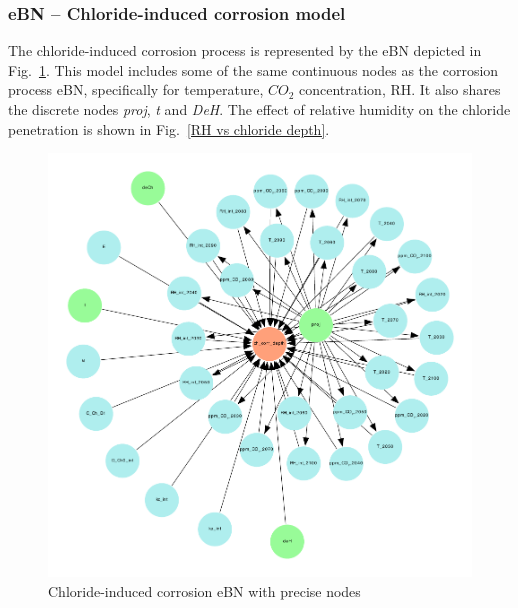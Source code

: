 \subsubsection{eBN -- Chloride-induced corrosion model}\label{ebn_chloride_section}
The chloride-induced corrosion process is represented by the eBN depicted in Fig.~\ref{chloride_ebn}. This model includes some of the same continuous nodes as the corrosion process eBN, specifically for temperature, $CO_2$ concentration, RH. It also shares the  discrete nodes \textit{proj}, \textit{t} and \textit{DeH}. The effect of relative humidity on the chloride penetration is shown in Fig.~\ref{RH vs chloride depth}.
\begin{figure}[H]
    \centering
    \includegraphics[width=\linewidth]{imgs/pdfs/9_chloride_ebn.pdf}
    \caption{Chloride-induced corrosion eBN with precise nodes}\label{chloride_ebn}
\end{figure}
